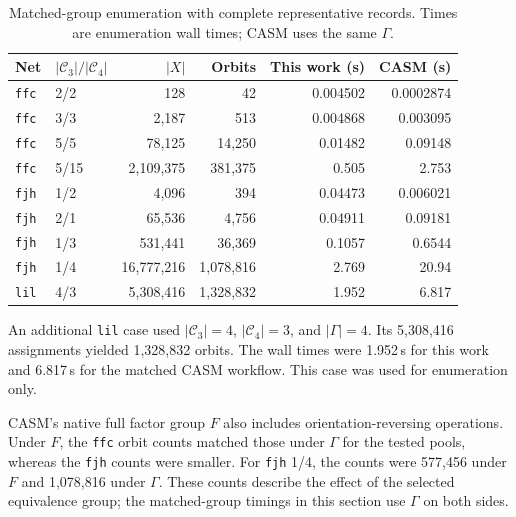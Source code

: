 \documentclass[a5paper, 10pt]{article}
\begin{document}
\begin{table}[H]
\centering\scriptsize
\setlength{\tabcolsep}{1.2mm}
\caption{Matched-group enumeration with complete representative records. Times are enumeration wall times; CASM uses the same $\Gamma$.}
\label{tab:matched_extra}
\begin{tabular}{llrrrr}
\toprule
Net & $|\mathcal C_3|/|\mathcal C_4|$ & $|X|$ & Orbits & This work (s) & CASM (s) \\
\midrule
\texttt{ffc} & 2/2 & 128 & 42 & 0.004502 & 0.0002874 \\
\texttt{ffc} & 3/3 & 2,187 & 513 & 0.004868 & 0.003095 \\
\texttt{ffc} & 5/5 & 78,125 & 14,250 & 0.01482 & 0.09148 \\
\texttt{ffc} & 5/15 & 2,109,375 & 381,375 & 0.505 & 2.753 \\
\texttt{fjh} & 1/2 & 4,096 & 394 & 0.04473 & 0.006021 \\
\texttt{fjh} & 2/1 & 65,536 & 4,756 & 0.04911 & 0.09181 \\
\texttt{fjh} & 1/3 & 531,441 & 36,369 & 0.1057 & 0.6544 \\
\texttt{fjh} & 1/4 & 16,777,216 & 1,078,816 & 2.769 & 20.94 \\
\texttt{lil} & 4/3 & 5,308,416 & 1,328,832 & 1.952 & 6.817 \\
\bottomrule
\end{tabular}
\end{table}

An additional \texttt{lil} case used $|\mathcal C_3|=4$, $|\mathcal C_4|=3$, and $|\Gamma|=4$. Its 5,308,416 assignments yielded 1,328,832 orbits. The wall times were 1.952\,s for this work and 6.817\,s for the matched CASM workflow. This case was used for enumeration only.

CASM's native full factor group $F$ also includes orientation-reversing operations. Under $F$, the \texttt{ffc} orbit counts matched those under $\Gamma$ for the tested pools, whereas the \texttt{fjh} counts were smaller. For \texttt{fjh} 1/4, the counts were 577,456 under $F$ and 1,078,816 under $\Gamma$. These counts describe the effect of the selected equivalence group; the matched-group timings in this section use $\Gamma$ on both sides.
\end{document}
